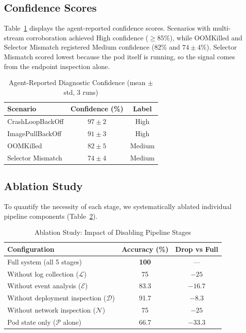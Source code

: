 \documentclass[12pt,onecolumn,draftclsnofoot]{IEEEtran}
\begin{document}
\subsection{Confidence Scores}
Table~\ref{tab:confidence} displays the agent-reported confidence scores. Scenarios with multi-stream corroboration achieved High confidence ($\geq 85\%$), while OOMKilled and Selector Mismatch registered Medium confidence (82\% and $74 \pm 4\%$). Selector Mismatch scored lowest because the pod itself is running, so the signal comes from the endpoint inspection alone.

\begin{table}[h]
\caption{Agent-Reported Diagnostic Confidence (mean $\pm$ std, 3 runs)}
\label{tab:confidence}
\centering
\begin{tabular}{lcc}
\toprule
\textbf{Scenario} & \textbf{Confidence (\%)} & \textbf{Label} \\
\midrule
CrashLoopBackOff    & $97 \pm 2$ & High \\
ImagePullBackOff    & $91 \pm 3$ & High \\
OOMKilled           & $82 \pm 5$ & Medium \\
Selector Mismatch   & $74 \pm 4$ & Medium \\
\bottomrule
\end{tabular}
\end{table}

\subsection{Ablation Study}
To quantify the necessity of each stage, we systematically ablated individual pipeline components (Table~\ref{tab:ablation}).

\begin{table}[h]
\caption{Ablation Study: Impact of Disabling Pipeline Stages}
\label{tab:ablation}
\centering
\begin{tabular}{lcc}
\toprule
\textbf{Configuration} & \textbf{Accuracy (\%)} & \textbf{Drop vs Full} \\
\midrule
Full system (all 5 stages)                    & \textbf{100} & --- \\
Without log collection ($\mathcal{L}$)        & 75           & $-25$ \\
Without event analysis ($\mathcal{E}$)        & 83.3         & $-16.7$ \\
Without deployment inspection ($\mathcal{D}$) & 91.7         & $-8.3$ \\
Without network inspection ($\mathcal{N}$)    & 75           & $-25$ \\
Pod state only ($\mathcal{P}$ alone)          & 66.7         & $-33.3$ \\
\bottomrule
\end{tabular}
\end{table}
\end{document}
